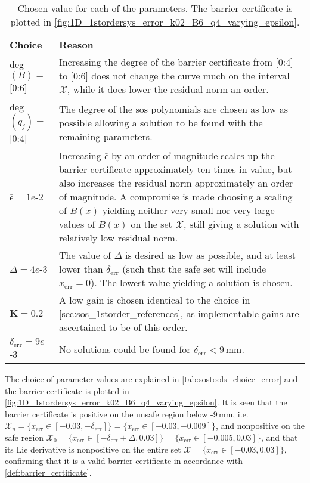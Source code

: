 
\begin{table}[htbp]
\begin{tabularx}{\textwidth}{l X}
		\rowcolor{HeaderBlue}
		\textbf{Choice} & \textbf{Reason}\\
		deg$(B)=$ [0:6] & Increasing the degree of the barrier certificate from [0:4] to [0:6] does not change the curve much on the interval $\mathcal{X}$, while it does lower the residual norm an order.\\
		\rowcolor{textBlue}
		deg$(q_j)=$ [0:4] & The degree of the \gls{sos} polynomials are chosen as low as possible allowing a solution to be found with the remaining parameters.\\
		$\bar{\epsilon}=1e$-2 & Increasing  $\bar{\epsilon}$ by an order of magnitude scales up the barrier certificate approximately ten times in value, but also increases  the residual norm approximately an order of magnitude. A compromise is made choosing a scaling of $B(x)$ yielding neither very small nor very large values of $B(x)$ on the set $\mathcal{X}$, still giving a solution with relatively low residual norm. \\
		\rowcolor{textBlue}
		$\Delta=4e$-3 & The value of $\Delta$ is desired as low as possible, and at least lower than $\delta_\text{err}$ (such that the safe set will include $x_\text{err}=0$). The lowest value yielding a solution is chosen.\\
		$\textbf{K}=0.2$ & A low gain is chosen identical to the choice in \autoref{sec:sos_1storder_references}, as implementable gains are ascertained to be of this order.\\
		\rowcolor{textBlue}
		$\delta_\text{err}=9e$-3 & No solutions could be found for $\delta_\text{err}<9$\,mm.
\end{tabularx}
\caption{Chosen value for each of the parameters. The barrier certificate is plotted in \autoref{fig:1D_1stordersys_error_k02_B6_q4_varying_epsilon}. %
	}
\label{tab:sostools_choice_error}
\end{table}

The choice of parameter values are explained in \autoref{tab:sostools_choice_error} and the barrier certificate is plotted in \autoref{fig:1D_1stordersys_error_k02_B6_q4_varying_epsilon}. %
It is seen that the barrier certificate is positive on the unsafe region below -9\,mm, i.e.  $\mathcal{X}_u=\{x_\text{err}\in[-0.03,-\delta_\text{err}]\}=\{x_\text{err}\in[-0.03,-0.009]\}$, and nonpositive on the safe region $\mathcal{X}_0=\{x_\text{err}\in[-\delta_\text{err}+\Delta,0.03]\}=\{x_\text{err}\in[-0.005,0.03]\}$, and that its Lie derivative is nonpositive on the entire set $\mathcal{X}=\{x_\text{err} \in[-0.03,0.03] \}$, confirming that it is a valid barrier certificate in accordance with \autoref{def:barrier_certificate}.

